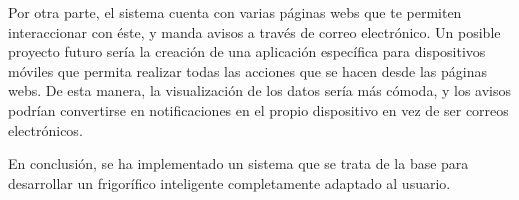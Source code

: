 Por otra parte, el sistema cuenta con varias páginas webs que te permiten interaccionar con éste, y manda avisos a través de correo electrónico. Un posible proyecto futuro sería la creación de una aplicación específica para dispositivos móviles que permita realizar todas las acciones que se hacen desde las páginas webs. De esta manera, la visualización de los datos sería más cómoda, y los avisos podrían convertirse en notificaciones en el propio dispositivo en vez de ser correos electrónicos.

En conclusión, se ha implementado un sistema que se trata de la base para desarrollar un frigorífico inteligente completamente adaptado al usuario. 